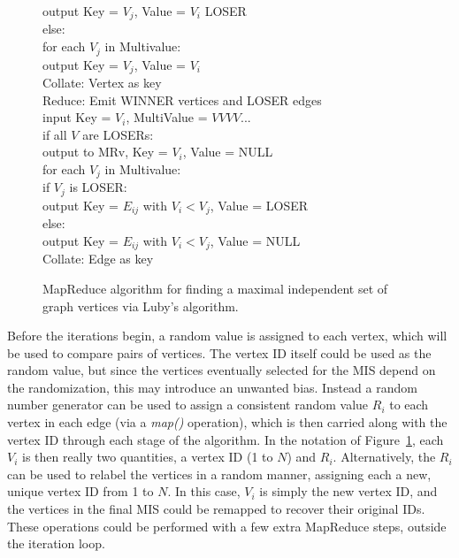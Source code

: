 \begin{figure}[htb]
\begin{center}
{\begin{minipage}{\textwidth}
\begin{tabbing}
     \> \> \> \> \> output Key = $V_j$, Value = $V_i$ LOSER \\
       \> \> \> else: \\
      \> \> \> \> for each $V_j$ in Multivalue: \\
     \> \> \> \> \> output Key = $V_j$, Value = $V_i$ \\
 Collate: \> Vertex as key \\
 Reduce: \> Emit WINNER vertices and LOSER edges \\
       \> \> \> input Key = $V_i$, MultiValue = $V V V V ...$ \\
       \> \> \> if all $V$ are LOSERs: \\
      \> \> \> \> output to MRv, Key = $V_i$, Value = NULL \\
       \> \> \> for each $V_j$ in Multivalue: \\
      \> \> \> \> if $V_j$ is LOSER: \\
     \> \> \> \> \> output Key = $E_{ij}$ with $V_i < V_j$, Value = LOSER \\
      \> \> \> \> else: \\
     \> \> \> \> \> output Key = $E_{ij}$ with $V_i < V_j$, Value = NULL \\
 Collate: \> Edge as key \\

  \end{tabbing}
 \end{minipage}}\end{center}

 \caption{MapReduce algorithm for finding a maximal independent set of
 graph vertices via Luby's algorithm.}

 \label{fig:luby}
\end{figure}

Before the iterations begin, a random value is assigned to each
vertex, which will be used to compare pairs of vertices.  The vertex
ID itself could be used as the random value, but since the vertices
eventually selected for the MIS depend on the randomization, this may
introduce an unwanted bias.  Instead a random number generator can be
used to assign a consistent random value $R_i$ to each vertex in each
edge (via a {\it map()} operation), which is then carried along with the
vertex ID through each stage of the algorithm.  In the notation of
Figure~\ref{fig:luby}, each $V_i$ is then really two quantities, a
vertex ID (1 to $N$) and $R_i$.  Alternatively, the $R_i$ can be used
to relabel the vertices in a random manner, assigning each a new,
unique vertex ID from 1 to $N$.  In this case, $V_i$ is simply the new
vertex ID, and the vertices in the final MIS could be remapped to
recover their original IDs.  These operations could be performed with
a few extra MapReduce steps, outside the iteration loop.

